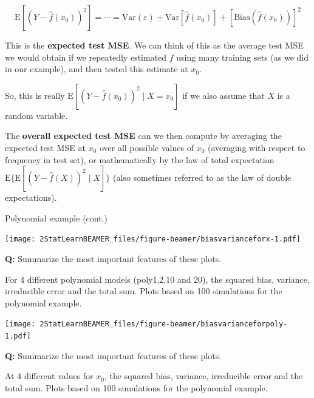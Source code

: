 \documentclass[ignorenonframetext,]{beamer}
\begin{document}
\begin{frame}

\[\text{E}[(Y - \hat{f}(x_0))^2]=\cdots=\text{Var}(\varepsilon) +  \text{Var}[\hat{f}(x_0)]+[\text{Bias}(\hat{f}(x_0))]^2\]

This is the \textbf{expected test MSE}. We can think of this as the
average test MSE we would obtain if we repeatedly estimated \(f\) using
many training sets (as we did in our example), and then tested this
estimate at \(x_0\).

So, this is really \(\text{E}[(Y - \hat{f}(x_0))^2 \mid X=x_0]\) if we
also assume that \(X\) is a random variable.

The \textbf{overall expected test MSE} can we then compute by averaging
the expected test MSE at \(x_0\) over all possible values of \(x_0\)
(averaging with respect to frequency in test set), or mathematically by
the law of total expectation
\(\text{E} \{ \text{E}[(Y - \hat{f}(X))^2 \mid X]\}\) (also sometimes
referred to as the law of double expectations).

\end{frame}

\begin{frame}

\begin{block}{Polynomial example (cont.)}

\texttt{[image: 2StatLearnBEAMER\_files/figure-beamer/biasvarianceforx-1.pdf]}

\textbf{Q:} Summarize the most important features of these plots.

For 4 different polynomial models (poly1,2,10 and 20), the squared bias,
variance, irreducible error and the total sum. Plots based on 100
simulations for the polynomial example.

\end{block}

\end{frame}

\begin{frame}

\texttt{[image: 2StatLearnBEAMER\_files/figure-beamer/biasvarianceforpoly-1.pdf]}

\textbf{Q:} Summarize the most important features of these plots.

At 4 different values for \(x_0\), the squared bias, variance,
irreducible error and the total sum. Plots based on 100 simulations for
the polynomial example.

\end{frame}
\end{document}
